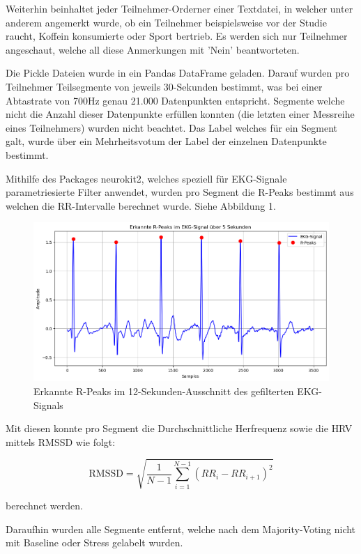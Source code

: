 Weiterhin beinhaltet jeder Teilnehmer-Orderner einer Textdatei, in welcher unter anderem angemerkt wurde, ob ein Teilnehmer beispielsweise vor der Studie raucht, Koffein konsumierte oder Sport bertrieb. Es werden sich nur Teilnehmer angeschaut, welche all diese Anmerkungen mit 'Nein' beantworteten.

Die Pickle Dateien wurde in ein Pandas DataFrame geladen. Darauf wurden pro Teilnehmer Teilsegmente von jeweils 30-Sekunden bestimmt, was bei einer Abtastrate von 700Hz genau 21.000 Datenpunkten entspricht. Segmente welche nicht die Anzahl dieser Datenpunkte erfüllen konnten (die letzten einer Messreihe eines Teilnehmers) wurden nicht beachtet. 
Das Label welches für ein Segment galt, wurde über ein Mehrheitsvotum der Label der einzelnen Datenpunkte bestimmt. 

Mithilfe des Packages neurokit2, welches speziell für \ac{EKG}-Signale parametriesierte Filter anwendet, wurden pro Segment die R-Peaks bestimmt aus welchen die RR-Intervalle berechnet wurde. Siehe Abbildung 1.

\begin{figure}[ht]
    \centering
    \includegraphics[width=1\textwidth]{Bilder/EKG-Plot.png}
    \caption{Erkannte R-Peaks im 12-Sekunden-Ausschnitt des gefilterten EKG-Signals}
    \label{fig:ekg-peaks}
\end{figure}

Mit diesen konnte pro Segment die Durchschnittliche Herfrequenz sowie die \ac{HRV} mittels \ac{RMSSD} wie folgt:

\[
\text{RMSSD} = \sqrt{\frac{1}{N-1} \sum_{i=1}^{N-1} (RR_i - RR_{i+1})^2}
\]

berechnet werden.

Daraufhin wurden alle Segmente entfernt, welche nach dem Majority-Voting nicht mit Baseline oder Stress gelabelt wurden.

